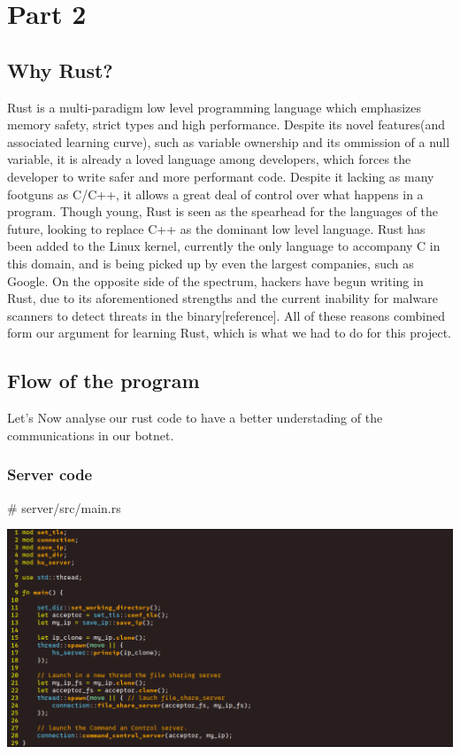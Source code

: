 \documentclass[../main.tex]{subfiles}
\begin{document}
	\chapter{Part 2}


	\section{Why Rust?}


    Rust is a multi-paradigm low level programming language which emphasizes memory safety, strict types and high performance. 
    Despite its novel features(and associated learning curve), such as variable ownership and its ommission of a null variable, it is already a loved language among developers, which forces the developer to write safer and more performant code.
    Despite it lacking as many footguns as C/C++, it allows a great deal of control over what happens in a program. 
    Though young, Rust is seen as the spearhead for the languages of the future, looking to replace C++ as the dominant low level language. 
    Rust has been added to the Linux kernel, currently the only language to accompany C in this domain, and is being picked up by even the largest companies, such as Google. On the opposite side of the spectrum, hackers have begun writing in Rust, due to its aforementioned strengths and the current inability for malware scanners to detect threats in the binary[reference]. 
    All of these reasons combined form our argument for learning Rust, which is what we had to do for this project.

	\vspace{10pt}

	\section{Flow of the program}

    Let's Now analyse our rust code to have a better understading of the communications in our botnet.
	\vspace{10pt}

	\subsection{Server code}

    \# server/src/main.rs

    \includegraphics[width=450pt]{server_main.png}
\end{document}
